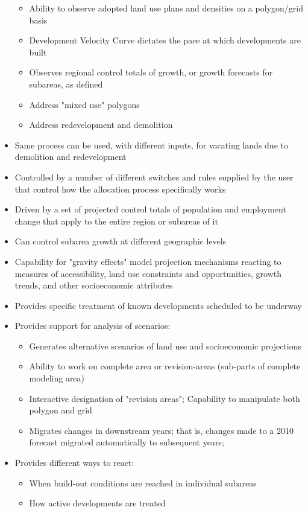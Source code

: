 \begin{itemize}
\begin{itemize}
\item Ability to observe adopted land use plans and densities on a polygon/grid basis
\item Development Velocity Curve dictates the pace at which developments are built
\item Observes regional control totals of growth, or growth forecasts for subareas, as defined
\item Address "mixed use" polygons
\item Address redevelopment and demolition
\end{itemize}
\item Same process can be used, with different inputs, for vacating lands due to demolition and redevelopment
\item Controlled by a number of different switches and rules supplied by the user that control how the allocation process specifically works
\item Driven by a set of projected control totals of population and employment change that apply to the entire region or subareas of it
\item Can control subarea growth at different geographic levels
\item Capability for  "gravity effects" model projection mechanisms reacting to measures of accessibility, land use constraints and opportunities, growth trends, and other socioeconomic attributes
\item Provides specific treatment of known developments scheduled to be underway
\item Provides support for analysis of scenarios:
\begin{itemize}
\item Generates alternative scenarios of land use and socioeconomic projections
\item Ability to work on complete area or revision-areas (sub-parts of complete modeling area)
\item Interactive designation of  "revision areas"; Capability to manipulate both polygon and grid
\item Migrates changes in downstream years; that is, changes made to a 2010 forecast migrated automatically to subsequent years;
\end{itemize}
\item Provides different ways to react:
\begin{itemize}
\item When build-out conditions are reached in individual subareas
\item How active developments are treated

\end{itemize}
\end{itemize}
